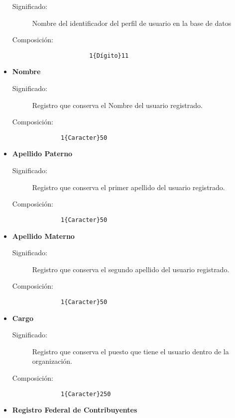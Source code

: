 \begin{itemize}
\begin{description}
      			\item [Significado:] Nombre del identificador del perfil de usuario en la base de datos
			\item [Composición:]{\begin{lstlisting}
				1{Dígito}11\end{lstlisting}}
    \end{description}
  \item \textbf{Nombre}\label{dd:nombre}
    \begin{description}
      \item [Significado:] Registro que conserva el Nombre del usuario registrado.
      \item [Composición:]{\begin{lstlisting}
        1{Caracter}50\end{lstlisting}}
    \end{description}
  \item \textbf{Apellido Paterno}\label{dd:apPat}
    \begin{description}
      \item [Significado:] Registro que conserva el primer apellido del usuario registrado.
      \item [Composición:]{\begin{lstlisting}
        1{Caracter}50\end{lstlisting}}
    \end{description}
  \item \textbf{Apellido Materno}\label{dd:apMat}
    \begin{description}
      \item [Significado:] Registro que conserva el segundo apellido del usuario registrado.
      \item [Composición:]{\begin{lstlisting}
        1{Caracter}50\end{lstlisting}}
    \end{description}
  \item \textbf{Cargo}\label{dd:cargo}
    \begin{description}
      \item [Significado:] Registro que conserva el puesto que tiene el usuario dentro de la organización.
      \item [Composición:]{\begin{lstlisting}
        1{Caracter}250\end{lstlisting}}
	\end{description}
  \item \textbf{Registro Federal de Contribuyentes}\label{dd:rfc}

\end{itemize}
